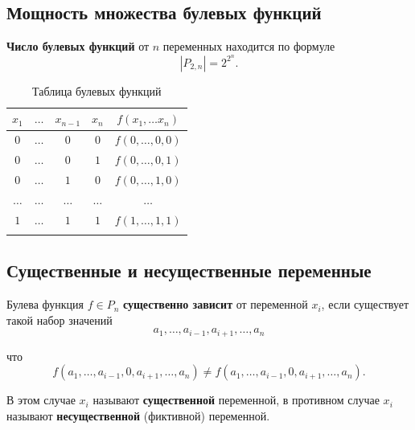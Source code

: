 \subsection{Мощность множества булевых функций}

\textbf{Число булевых функций} от \(n\) переменных находится по формуле
\[
    |P_{2, n}| = 2^{2^n}.
\]

{
\renewcommand*{\arraystretch}{1.5}
\begin{longtable}{|c|c|c|c|c|}
    \hline
    \(x_1\)    & \(\ldots\) & \(x_{n - 1}\) & \(x_n\)    & \(f(x_1, \ldots x_n)\) \\
    \hline
    \(0\)      & \(\ldots\) & \(0\)         & \(0\)      & \(f(0, \ldots, 0, 0)\) \\
    \hline
    \(0\)      & \(\ldots\) & \(0\)         & \(1\)      & \(f(0, \ldots, 0, 1)\) \\
    \hline
    \(0\)      & \(\ldots\) & \(1\)         & \(0\)      & \(f(0, \ldots, 1, 0)\) \\
    \hline
    \(\ldots\) & \(\ldots\) & \(\ldots\)    & \(\ldots\) & \(\ldots\)             \\
    \hline
    \(1\)      & \(\ldots\) & \(1\)         & \(1\)      & \(f(1, \ldots, 1, 1)\) \\
    \hline
    \caption{Таблица булевых функций}
\end{longtable}
}

\subsection{Существенные и несущественные переменные}

Булева функция \(f \in P_n\) \textbf{существенно зависит} от переменной \(x_i\), если существует такой набор значений
\[
    a_1, \ldots, a_{i - 1}, a_{i +1}, \ldots, a_n
\]

что
\[
    f(a_1, \ldots, a_{i - 1}, 0, a_{i +1}, \ldots, a_n) \neq f(a_1, \ldots, a_{i - 1}, 0, a_{i +1}, \ldots, a_n).
\]

В этом случае \(x_i\) называют \textbf{существенной} переменной, в противном случае \(x_i\) называют \textbf{несущественной} (фиктивной) переменной.

